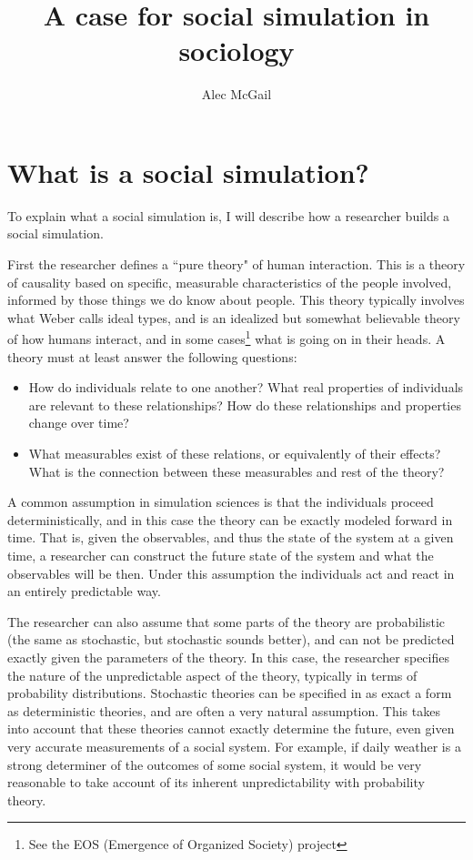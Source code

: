 \documentclass[]{article}
\title{A case for social simulation in sociology}
\author{Alec McGail}
\begin{document}
	\maketitle
	
	\section{What is a social simulation?}
	To explain what a social simulation is, I will describe how a researcher builds a social simulation.
	
	First the researcher defines a ``pure theory" of human interaction. This is a theory of causality based on specific, measurable characteristics of the people involved, informed by those things we do know about people. 
	This theory typically involves what Weber calls ideal types, and is an idealized but somewhat believable theory of how humans interact, and in some cases\footnote{See the EOS (Emergence of Organized Society) project\cite{Doran1994}} what is going on in their heads.
	A theory must at least answer the following questions:
	
	\begin{itemize}
		\item How do individuals relate to one another? What real properties of individuals are relevant to these relationships? How do these relationships and properties change over time? 
		\item What measurables exist of these relations, or equivalently of their effects? What is the connection between these measurables and rest of the theory?
	\end{itemize}
		
	A common assumption in simulation sciences is that the individuals proceed deterministically, and in this case the theory can be exactly modeled forward in time. 
	That is, given the observables, and thus the state of the system at a given time, a researcher can construct the future state of the system and what the observables will be then. 
	Under this assumption the individuals act and react in an entirely predictable way.
	
	The researcher can also assume that some parts of the theory are probabilistic (the same as stochastic, but stochastic sounds better), and can not be predicted exactly given the parameters of the theory. 
	In this case, the researcher specifies the nature of the unpredictable aspect of the theory, typically in terms of probability distributions.
	Stochastic theories can be specified in as exact a form as deterministic theories, and are often a very natural assumption.
	This takes into account that these theories cannot exactly determine the future, even given very accurate measurements of a social system.
	For example, if daily weather is a strong determiner of the outcomes of some social system, it would be very reasonable to take account of its inherent unpredictability with probability theory.
	
\end{document}
